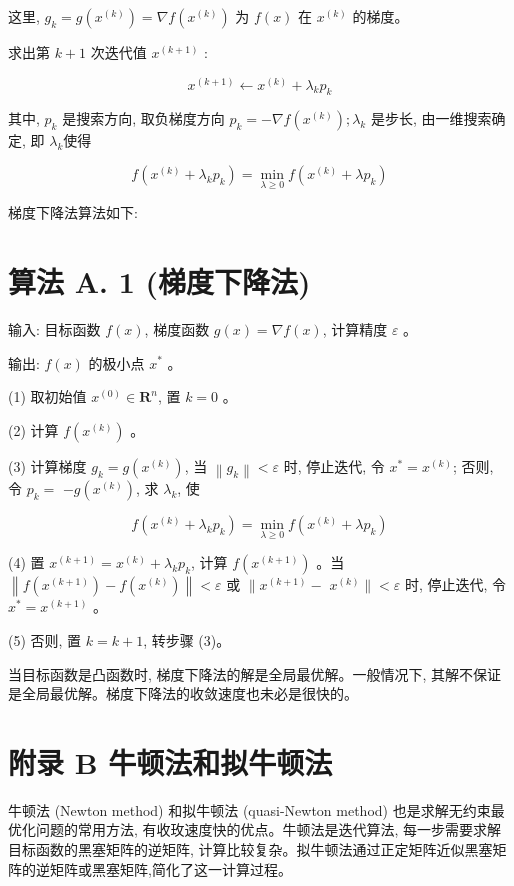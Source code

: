 \documentclass[10pt]{article}
\begin{document}
这里, $g_{k}=g\left(x^{(k)}\right)=\nabla f\left(x^{(k)}\right)$ 为 $f(x)$ 在 $x^{(k)}$ 的梯度。

求出第 $k+1$ 次迭代值 $x^{(k+1)}$ :


\begin{equation*}
x^{(k+1)} \leftarrow x^{(k)}+\lambda_{k} p_{k} \tag{A.3}
\end{equation*}


其中, $p_{k}$ 是搜索方向, 取负梯度方向 $p_{k}=-\nabla f\left(x^{(k)}\right) ; \lambda_{k}$ 是步长, 由一维搜索确定, 即 $\lambda_{k}$使得


\begin{equation*}
f\left(x^{(k)}+\lambda_{k} p_{k}\right)=\min _{\lambda \geqslant 0} f\left(x^{(k)}+\lambda p_{k}\right) \tag{A.4}
\end{equation*}


梯度下降法算法如下:

\section*{算法 A. 1 (梯度下降法)}
输入: 目标函数 $f(x)$, 梯度函数 $g(x)=\nabla f(x)$, 计算精度 $\varepsilon$ 。

输出: $f(x)$ 的极小点 $x^{*}$ 。

(1) 取初始值 $x^{(0)} \in \boldsymbol{R}^{n}$, 置 $k=0$ 。

(2) 计算 $f\left(x^{(k)}\right)$ 。

(3) 计算梯度 $g_{k}=g\left(x^{(k)}\right)$, 当 $\left\|g_{k}\right\|<\varepsilon$ 时, 停止迭代, 令 $x^{*}=x^{(k)}$; 否则, 令 $p_{k}=$ $-g\left(x^{(k)}\right)$, 求 $\lambda_{k}$, 使

$$
f\left(x^{(k)}+\lambda_{k} p_{k}\right)=\min _{\lambda \geqslant 0} f\left(x^{(k)}+\lambda p_{k}\right)
$$

(4) 置 $x^{(k+1)}=x^{(k)}+\lambda_{k} p_{k}$, 计算 $f\left(x^{(k+1)}\right)$ 。当 $\left\|f\left(x^{(k+1)}\right)-f\left(x^{(k)}\right)\right\|<\varepsilon$ 或 $\| x^{(k+1)}-$ $x^{(k)} \|<\varepsilon$ 时, 停止迭代, 令 $x^{*}=x^{(k+1)}$ 。

(5) 否则, 置 $k=k+1$, 转步骤 (3)。

当目标函数是凸函数时, 梯度下降法的解是全局最优解。一般情况下, 其解不保证是全局最优解。梯度下降法的收敛速度也未必是很快的。

\section*{附录 B 牛顿法和拟牛顿法}
牛顿法 (Newton method) 和拟牛顿法 (quasi-Newton method) 也是求解无约束最优化问题的常用方法, 有收玫速度快的优点。牛顿法是迭代算法, 每一步需要求解目标函数的黑塞矩阵的逆矩阵, 计算比较复杂。拟牛顿法通过正定矩阵近似黑塞矩阵的逆矩阵或黑塞矩阵,简化了这一计算过程。
\end{document}
